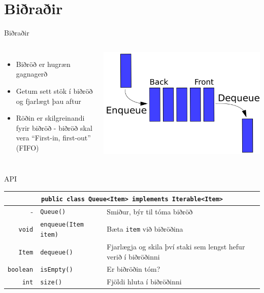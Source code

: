 \documentclass{beamer}
\begin{document}
\section{Biðraðir}

\begin{frame}{Biðraðir}
	\begin{columns}[c]
		\begin{itemize}
			\item Biðröð er hugræn gagnagerð
			\item Getum sett stök í biðröð og fjarlægt þau aftur
			\item Röðin er skilgreinandi fyrir biðröð - biðröð skal vera ``First-in, first-out'' (FIFO)
		\end{itemize}
		\includegraphics[width=\linewidth]{Pics/queue}
	\end{columns}
\end{frame}

\begin{frame}{API}
	\begin{center}
		\begin{tabularx}{\textwidth}{rlX}
			\toprule
			\multicolumn{3}{c}{\texttt{public class Queue<Item> implements Iterable<Item>}}                                   \\
			\midrule
			-                & \texttt{Queue()}            & Smiður, býr til tóma biðröð                                      \\
			\texttt{void}    & \texttt{enqueue(Item item)} & Bæta \texttt{item} við biðröðina                                 \\
			\texttt{Item}    & \texttt{dequeue()}          & Fjarlægja og skila því staki sem lengst hefur verið í biðröðinni \\
			\texttt{boolean} & \texttt{isEmpty()}          & Er biðröðin tóm?                                                 \\
			\texttt{int}     & \texttt{size()}             & Fjöldi hluta í biðröðinni                                        \\
			\bottomrule
		\end{tabularx}
	\end{center}
\end{frame}
\end{document}
